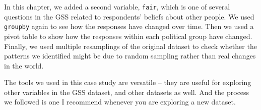 In this chapter, we added a second variable,
\passthrough{\lstinline!fair!}, which is one of several questions in the
GSS related to respondents' beliefs about other people. We used
\passthrough{\lstinline!groupby!} again to see how the responses have
changed over time. Then we used a pivot table to show how the responses
within each political group have changed. Finally, we used multiple
resamplings of the original dataset to check whether the patterns we
identified might be due to random sampling rather than real changes in
the world.

The tools we used in this case study are versatile -- they are useful
for exploring other variables in the GSS dataset, and other datasets as
well. And the process we followed is one I recommend whenever you are
exploring a new dataset.
